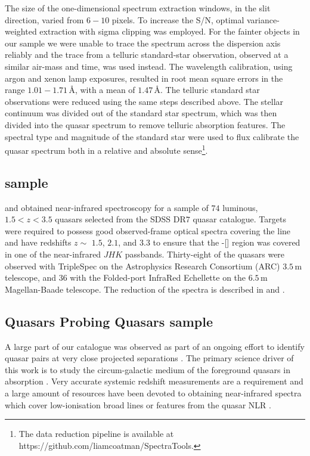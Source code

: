 The size of the one-dimensional spectrum extraction windows, in the slit direction, varied from $6-10$ pixels. 
To increase the S/N, optimal variance-weighted extraction with sigma clipping was employed. 
For the fainter objects in our sample we were unable to trace the spectrum across the dispersion axis reliably and the trace from a telluric standard-star observation, observed at a similar air-mass and time, was used instead. 
The wavelength calibration, using argon and xenon lamp exposures, resulted in root mean square errors in the range $1.01-1.71$\,\AA, with a mean of $1.47$\,\AA. 
The telluric standard star observations were reduced using the same steps described above. 
The stellar continuum was divided out of the standard star spectrum, which was then divided into the quasar spectrum to remove telluric absorption features. 
The spectral type and magnitude of the standard star were used to flux calibrate the quasar spectrum both in a relative and absolute sense\footnote{The data reduction pipeline is available at https://github.com/liamcoatman/SpectraTools.}.

\subsection{\citet{shen16a} sample}

\citet{shen16a} and \citet{shen12} obtained near-infrared spectroscopy for a sample of $74$ luminous, $1.5 < z < 3.5$ quasars selected from the SDSS DR$7$ quasar catalogue. 
Targets were required to possess good observed-frame optical spectra covering the  line and have redshifts $z\sim$ $1.5$, $2.1$, and $3.3$ to ensure that the \hbns-[] region was covered in one of the near-infrared $JHK$ passbands.
Thirty-eight of the quasars were observed with TripleSpec \citep{wilson04} on the Astrophysics Research Consortium (ARC) $3.5$\,m telescope, and $36$ with the Folded-port InfraRed Echellette \citep[FIRE;][]{simcoe10} on the $6.5$\,m Magellan-Baade telescope.
The reduction of the spectra is described in \citet{shen16a} and \citet{shen12}. 

\subsection{Quasars Probing Quasars sample}

A large part of our catalogue was observed as part of an ongoing effort to identify quasar pairs at very close projected separations \citep[Quasars Probing Quasars\footnote{www.ucolick.org/\textasciitilde xavier/QPQ/Quasars\_Probing\_Quasars};][]{hennawi06a,hennawi10}. 
The primary science driver of this work is to study the circum-galactic medium of the foreground quasars in absorption \citep{hennawi06b}.
Very accurate systemic redshift measurements are a requirement and a large amount of resources have been devoted to obtaining near-infrared spectra which cover low-ionisation broad lines or features from the quasar NLR \citep{prochaska09,lau16,hennawi15}. 

